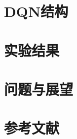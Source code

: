 \documentclass[aspectratio=169]{beamer}
\begin{document}


\section{DQN结构}



\section{实验结果}



\section{问题与展望}



\section{参考文献}


\end{document}
